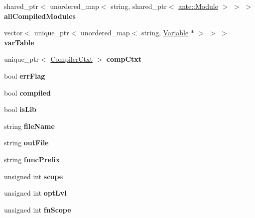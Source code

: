 \begin{DoxyCompactItemize}
\item 
\mbox{\label{structante_1_1Compiler_a1bf965c9ee5499947458b8ce739a954a}} 
shared\+\_\+ptr$<$ unordered\+\_\+map$<$ string, shared\+\_\+ptr$<$ \hyperlink{structante_1_1Module}{ante\+::\+Module} $>$ $>$ $>$ {\bfseries all\+Compiled\+Modules}
\item 
\mbox{\label{structante_1_1Compiler_af08b993f5750d7c5d22a1797973806d6}} 
vector$<$ unique\+\_\+ptr$<$ unordered\+\_\+map$<$ string, \hyperlink{structVariable}{Variable} $\ast$ $>$ $>$ $>$ {\bfseries var\+Table}
\item 
\mbox{\label{structante_1_1Compiler_a244b0e72828c82cf0bf371ae0c296021}} 
unique\+\_\+ptr$<$ \hyperlink{structante_1_1CompilerCtxt}{Compiler\+Ctxt} $>$ {\bfseries comp\+Ctxt}
\item 
\mbox{\label{structante_1_1Compiler_a2b937b0373fd399673d1e949bae33987}} 
bool {\bfseries err\+Flag}
\item 
\mbox{\label{structante_1_1Compiler_ab3af520cc4406c344cb13085b9064667}} 
bool {\bfseries compiled}
\item 
\mbox{\label{structante_1_1Compiler_a2eada2ae7db8a214762cec4efcdd51e6}} 
bool {\bfseries is\+Lib}
\item 
\mbox{\label{structante_1_1Compiler_a7a576d883e0dd34d6a4f19d94ba83a44}} 
string {\bfseries file\+Name}
\item 
\mbox{\label{structante_1_1Compiler_a4a207b55956fa1d74b56ca9aa1955292}} 
string {\bfseries out\+File}
\item 
\mbox{\label{structante_1_1Compiler_aedc2565aa8d4b420f0e1b73042fe763c}} 
string {\bfseries func\+Prefix}
\item 
\mbox{\label{structante_1_1Compiler_a985cda2993bbf58b0120a87905759bd3}} 
unsigned int {\bfseries scope}
\item 
\mbox{\label{structante_1_1Compiler_a9a0f791776d450019cc3272fdfbfbe19}} 
unsigned int {\bfseries opt\+Lvl}
\item 
\mbox{\label{structante_1_1Compiler_a4772b7ae7d73420190a7647ee53f812e}} 
unsigned int {\bfseries fn\+Scope}
\end{DoxyCompactItemize}


